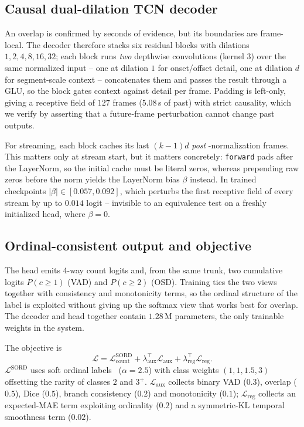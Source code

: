 \documentclass[journal]{IEEEtran}
\begin{document}
\subsection{Causal dual-dilation TCN decoder}
An overlap is confirmed by seconds of evidence, but its boundaries are
frame-local. The decoder therefore stacks six residual blocks with dilations
$1,2,4,8,16,32$; each block runs \emph{two} depthwise convolutions
(kernel $3$) over the same normalized input -- one at dilation $1$ for
onset/offset detail, one at dilation $d$ for segment-scale context --
concatenates them and passes the result through a GLU, so the block gates
context against detail per frame. Padding is left-only, giving a receptive
field of $127$ frames ($5.08$\,s of past) with strict causality, which we
verify by asserting that a future-frame perturbation cannot change past
outputs.

For streaming, each block caches its last $(k\!-\!1)d$ \emph{post}%
-normalization frames. This matters only at stream start, but it matters
concretely: \texttt{forward} pads after the LayerNorm, so the initial cache
must be literal zeros, whereas prepending raw zeros before the norm yields
the LayerNorm bias $\beta$ instead. In trained checkpoints
$|\beta| \in [0.057, 0.092]$, which perturbs the first receptive field of
every stream by up to $0.014$ logit -- invisible to an equivalence test on a
freshly initialized head, where $\beta = 0$.

\subsection{Ordinal-consistent output and objective}
\label{sec:objective}
The head emits 4-way count logits and, from the same trunk, two cumulative
logits $P(c\!\geq\!1)$ (VAD) and $P(c\!\geq\!2)$ (OSD). Training ties the
two views together with consistency and monotonicity terms, so the ordinal
structure of the label is exploited without giving up the softmax view that
works best for overlap. The decoder and head together contain $1.28$\,M
parameters, the only trainable weights in the system.

The objective is
\begin{equation}
\mathcal{L}=\mathcal{L}^{\text{SORD}}_{\text{count}}
+\lambda_{\text{aux}}^{\top}\mathcal{L}_{\text{aux}}
+\lambda_{\text{reg}}^{\top}\mathcal{L}_{\text{reg}} .
\end{equation}
$\mathcal{L}^{\text{SORD}}$ uses soft ordinal labels~\cite{diaz2019sord}
($\alpha\!=\!2.5$) with class weights $(1,1,1.5,3)$ offsetting the rarity of
classes $2$ and $3^{+}$. $\mathcal{L}_{\text{aux}}$ collects binary VAD
($0.3$), overlap ($0.5$), Dice ($0.5$), branch consistency ($0.2$) and
monotonicity ($0.1$); $\mathcal{L}_{\text{reg}}$ collects an expected-MAE
term exploiting ordinality ($0.2$) and a symmetric-KL temporal smoothness
term ($0.02$).
\end{document}
